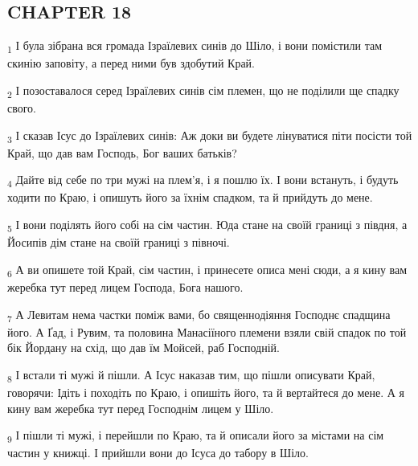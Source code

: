 \subsection{CHAPTER 18}
\begin{tcolorbox}
\textsubscript{1} І була зібрана вся громада Ізраїлевих синів до Шіло, і вони помістили там скинію заповіту, а перед ними був здобутий Край.
\end{tcolorbox}
\begin{tcolorbox}
\textsubscript{2} І позоставалося серед Ізраїлевих синів сім племен, що не поділили ще спадку свого.
\end{tcolorbox}
\begin{tcolorbox}
\textsubscript{3} І сказав Ісус до Ізраїлевих синів: Аж доки ви будете лінуватися піти посісти той Край, що дав вам Господь, Бог ваших батьків?
\end{tcolorbox}
\begin{tcolorbox}
\textsubscript{4} Дайте від себе по три мужі на плем'я, і я пошлю їх. І вони встануть, і будуть ходити по Краю, і опишуть його за їхнім спадком, та й прийдуть до мене.
\end{tcolorbox}
\begin{tcolorbox}
\textsubscript{5} І вони поділять його собі на сім частин. Юда стане на своїй границі з півдня, а Йосипів дім стане на своїй границі з півночі.
\end{tcolorbox}
\begin{tcolorbox}
\textsubscript{6} А ви опишете той Край, сім частин, і принесете описа мені сюди, а я кину вам жеребка тут перед лицем Господа, Бога нашого.
\end{tcolorbox}
\begin{tcolorbox}
\textsubscript{7} А Левитам нема частки поміж вами, бо священнодіяння Господнє спадщина його. А Ґад, і Рувим, та половина Манасіїного племени взяли свій спадок по той бік Йордану на схід, що дав їм Мойсей, раб Господній.
\end{tcolorbox}
\begin{tcolorbox}
\textsubscript{8} І встали ті мужі й пішли. А Ісус наказав тим, що пішли описувати Край, говорячи: Ідіть і походіть по Краю, і опишіть його, та й вертайтеся до мене. А я кину вам жеребка тут перед Господнім лицем у Шіло.
\end{tcolorbox}
\begin{tcolorbox}
\textsubscript{9} І пішли ті мужі, і перейшли по Краю, та й описали його за містами на сім частин у книжці. І прийшли вони до Ісуса до табору в Шіло.
\end{tcolorbox}
